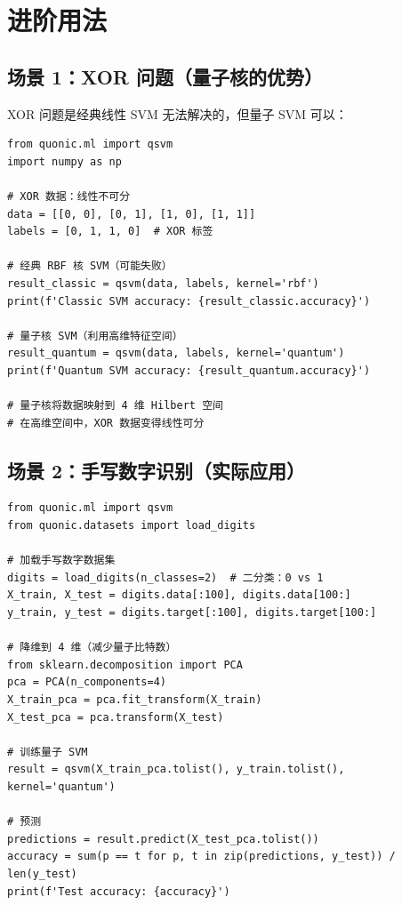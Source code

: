 \documentclass[12pt,a4paper]{article}
\begin{document}
\section{进阶用法}

\subsection{场景 1：XOR 问题（量子核的优势）}

XOR 问题是经典线性 SVM 无法解决的，但量子 SVM 可以：

\begin{verbatim}
from quonic.ml import qsvm
import numpy as np

# XOR 数据：线性不可分
data = [[0, 0], [0, 1], [1, 0], [1, 1]]
labels = [0, 1, 1, 0]  # XOR 标签

# 经典 RBF 核 SVM（可能失败）
result_classic = qsvm(data, labels, kernel='rbf')
print(f'Classic SVM accuracy: {result_classic.accuracy}')

# 量子核 SVM（利用高维特征空间）
result_quantum = qsvm(data, labels, kernel='quantum')
print(f'Quantum SVM accuracy: {result_quantum.accuracy}')

# 量子核将数据映射到 4 维 Hilbert 空间
# 在高维空间中，XOR 数据变得线性可分
\end{verbatim}

\subsection{场景 2：手写数字识别（实际应用）}

\begin{verbatim}
from quonic.ml import qsvm
from quonic.datasets import load_digits

# 加载手写数字数据集
digits = load_digits(n_classes=2)  # 二分类：0 vs 1
X_train, X_test = digits.data[:100], digits.data[100:]
y_train, y_test = digits.target[:100], digits.target[100:]

# 降维到 4 维（减少量子比特数）
from sklearn.decomposition import PCA
pca = PCA(n_components=4)
X_train_pca = pca.fit_transform(X_train)
X_test_pca = pca.transform(X_test)

# 训练量子 SVM
result = qsvm(X_train_pca.tolist(), y_train.tolist(), kernel='quantum')

# 预测
predictions = result.predict(X_test_pca.tolist())
accuracy = sum(p == t for p, t in zip(predictions, y_test)) / len(y_test)
print(f'Test accuracy: {accuracy}')
\end{verbatim}
\end{document}
